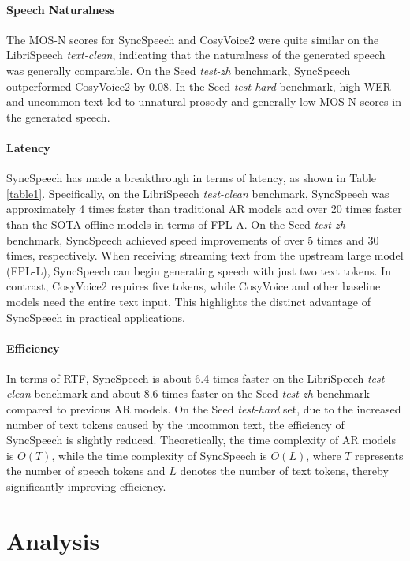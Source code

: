 \paragraph{Speech Naturalness} The MOS-N scores for SyncSpeech and CosyVoice2 were quite similar on the LibriSpeech \textit{text-clean}, indicating that the naturalness of the generated speech was generally comparable. On the Seed \textit{test-zh} benchmark, SyncSpeech outperformed CosyVoice2 by 0.08.  In the Seed \textit{test-hard} benchmark, high WER and uncommon text led to unnatural prosody and generally low MOS-N scores in the generated speech.
\paragraph{Latency} SyncSpeech has made a breakthrough in terms of latency, as shown in Table \ref{table1}. Specifically, on the LibriSpeech \textit{test-clean} benchmark, SyncSpeech was approximately 4 times faster than traditional AR models and over 20 times faster than the SOTA offline models in terms of FPL-A. On the Seed \textit{test-zh} benchmark, SyncSpeech achieved speed improvements of over 5 times and 30 times, respectively. When receiving streaming text from the upstream large model (FPL-L), SyncSpeech can begin generating speech with just two text tokens. In contrast, CosyVoice2 requires five tokens, while CosyVoice and other baseline models need the entire text input. This highlights the distinct advantage of SyncSpeech in practical applications.

\paragraph{Efficiency} In terms of RTF, SyncSpeech is about 6.4 times faster on the LibriSpeech \textit{test-clean} benchmark and about 8.6 times faster on the Seed \textit{test-zh} benchmark compared to previous AR models. 
On the Seed \textit{test-hard} set, due to the increased number of text tokens caused by the uncommon text, the efficiency of SyncSpeech is slightly reduced. Theoretically, the time complexity of AR models is $O(T)$, while the time complexity of SyncSpeech is  $O(L)$, where  $T$ represents the number of speech tokens and 
$L$ denotes the number of text tokens, thereby significantly improving efficiency.

\section{Analysis}
